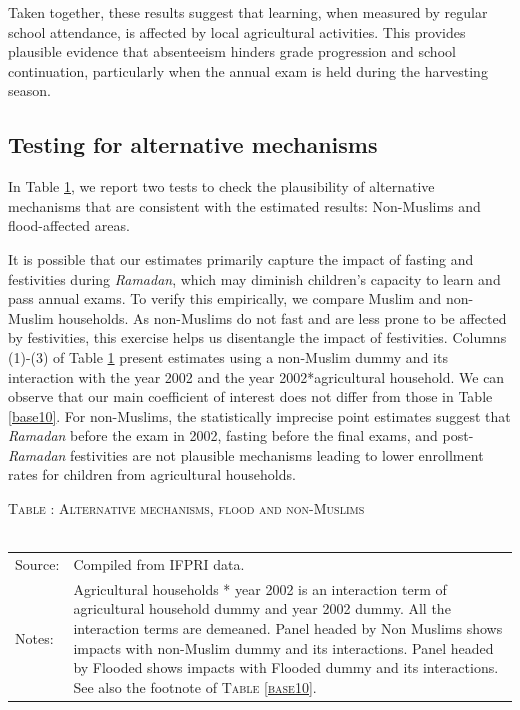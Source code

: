 \documentclass[12pt,letterpaper]{article}\usepackage[margin=1in]{geometry}
\newcommand{\0}{\ensuremath{\mbox{\boldmath $0$}}}
\begin{document}
Taken together, these results suggest that learning, when measured by regular school attendance, is affected by local agricultural activities. This provides plausible evidence that absenteeism hinders grade progression and school continuation, particularly when the annual exam is held during the harvesting season.

\subsection{Testing for alternative mechanisms}

In Table \ref{FloodNonMuslimResultsConcise}, we report two tests to check the plausibility of alternative mechanisms that are consistent with the estimated results: Non-Muslims and flood-affected areas. 

It is possible that our estimates primarily capture the impact of fasting and festivities during \textit{Ramadan}, which may diminish children's capacity to learn and pass annual exams. To verify this empirically, we compare Muslim and non-Muslim households. As non-Muslims do not fast and are less prone to be affected by festivities, this exercise helps us disentangle the impact of festivities. Columns (1)-(3) of Table \ref{FloodNonMuslimResultsConcise} present estimates using a non-Muslim dummy and its interaction with the year 2002 and the year 2002*agricultural household. We can observe that our main coefficient of interest does not differ from those in Table \ref{base10}. For non-Muslims, the statistically imprecise point estimates suggest that \textit{Ramadan} before the exam in 2002, fasting before the final exams, and post-\textit{Ramadan} festivities are not plausible mechanisms leading to lower enrollment rates for children from agricultural households.

\begin{table}\hfil\textsc{\footnotesize Table \thetable: Alternative mechanisms, flood and non-Muslims\label{FloodNonMuslimResultsConcise}}\\\setlength{\tabcolsep}{.5pt}\renewcommand{\arraystretch}{.675}\hspace{-2em}\hfil\\
\renewcommand{\arraystretch}{1}
\hfil\begin{tabular}{>{\hfill\scriptsize}p{1cm}<{}>{\scriptsize}p{12cm}<{\hfill}} 
Source:& Compiled from IFPRI data. \\[-1ex] 
Notes:&  \textsf{Agricultural households * year 2002} is an interaction term of agricultural household dummy and year 2002 dummy. All the interaction terms are demeaned. Panel headed by Non Muslims shows impacts with non-Muslim dummy and its interactions. Panel headed by Flooded shows impacts with Flooded dummy and its interactions. See also the footnote of \textsc{\footnotesize Table \ref{base10}}. 
\end{tabular} \end{table}
\end{document}
